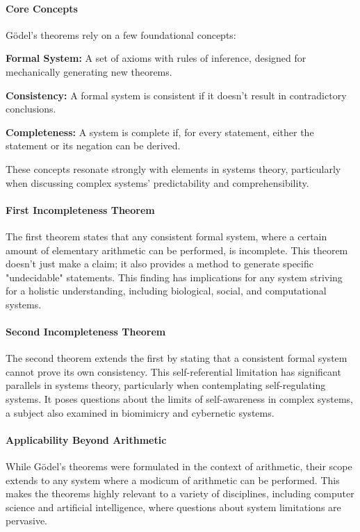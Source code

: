\documentclass[sn-nature]{sn-jnl}%
\theoremstyle{thmstyleone}%
\theoremstyle{thmstyletwo}%
\theoremstyle{thmstylethree}%
\begin{document}
\paragraph{Core Concepts}
Gödel’s theorems rely on a few foundational concepts:

\textbf{Formal System:} A set of axioms with rules of inference, designed for mechanically generating new theorems.

\textbf{Consistency:} A formal system is consistent if it doesn't result in contradictory conclusions.

\textbf{Completeness:} A system is complete if, for every statement, either the statement or its negation can be derived.

These concepts resonate strongly with elements in systems theory, particularly when discussing complex systems' predictability and comprehensibility.

\paragraph{First Incompleteness Theorem}
The first theorem states that any consistent formal system, where a certain amount of elementary arithmetic can be performed, is incomplete. This theorem doesn't just make a claim; it also provides a method to generate specific "undecidable" statements. This finding has implications for any system striving for a holistic understanding, including biological, social, and computational systems.

\paragraph{Second Incompleteness Theorem}
The second theorem extends the first by stating that a consistent formal system cannot prove its own consistency. This self-referential limitation has significant parallels in systems theory, particularly when contemplating self-regulating systems. It poses questions about the limits of self-awareness in complex systems, a subject also examined in biomimicry and cybernetic systems.

\paragraph{Applicability Beyond Arithmetic}
While Gödel's theorems were formulated in the context of arithmetic, their scope extends to any system where a modicum of arithmetic can be performed. This makes the theorems highly relevant to a variety of disciplines, including computer science and artificial intelligence, where questions about system limitations are pervasive.
\end{document}
